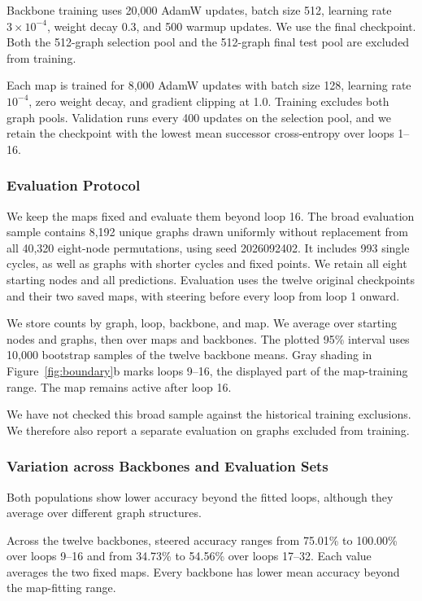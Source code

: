 \documentclass{article}
\begin{document}
Backbone training uses 20,000 AdamW updates, batch size 512, learning rate $3\times10^{-4}$, weight decay 0.3, and 500 warmup updates. We use the final checkpoint. Both the 512-graph selection pool and the 512-graph final test pool are excluded from training.

Each map is trained for 8,000 AdamW updates with batch size 128, learning rate $10^{-4}$, zero weight decay, and gradient clipping at 1.0. Training excludes both graph pools. Validation runs every 400 updates on the selection pool, and we retain the checkpoint with the lowest mean successor cross-entropy over loops 1--16.

\subsubsection{Evaluation Protocol}

We keep the maps fixed and evaluate them beyond loop 16. The broad evaluation sample contains 8,192 unique graphs drawn uniformly without replacement from all 40,320 eight-node permutations, using seed 2026092402. It includes 993 single cycles, as well as graphs with shorter cycles and fixed points. We retain all eight starting nodes and all predictions. Evaluation uses the twelve original checkpoints and their two saved maps, with steering before every loop from loop 1 onward.

We store counts by graph, loop, backbone, and map. We average over starting nodes and graphs, then over maps and backbones. The plotted 95\% interval uses 10,000 bootstrap samples of the twelve backbone means. Gray shading in Figure~\ref{fig:boundary}b marks loops 9--16, the displayed part of the map-training range. The map remains active after loop 16.

We have not checked this broad sample against the historical training exclusions. We therefore also report a separate evaluation on graphs excluded from training.

\subsubsection{Variation across Backbones and Evaluation Sets}
Both populations show lower accuracy beyond the fitted loops, although they average over different graph structures.

Across the twelve backbones, steered accuracy ranges from 75.01\% to 100.00\% over loops 9--16 and from 34.73\% to 54.56\% over loops 17--32. Each value averages the two fixed maps. Every backbone has lower mean accuracy beyond the map-fitting range.
\end{document}

